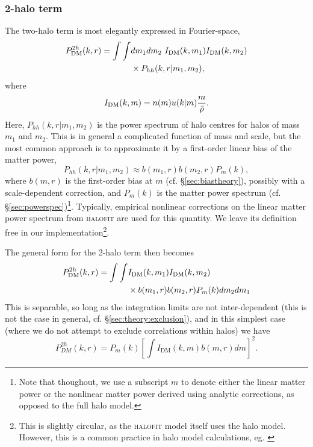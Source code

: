 \documentclass[5p,aas_macros]{elsarticle}
\begin{document}
\subsubsection{2-halo term}
\label{sec:theory:2halo}
The two-halo term is most elegantly expressed in Fourier-space, 
\begin{align}
    P_{\rm DM}^{2h}(k,r) =  \int \int & dm_1 dm_2\  I_{\rm DM}(k,m_1) I_{\rm DM}(k,m_2) \nonumber \\ 
    &\times P_{hh}(k,r|m_1,m_2),
\end{align}
where
\begin{equation}
    I_{\rm DM}(k,m) = n(m) u(k|m) \frac{m}{\bar{\rho}}.
\end{equation}
Here, $P_{hh}(k,r|m_1,m_2)$ is the power spectrum of halo centres for halos of mass $m_1$ and $m_2$. This is in general a complicated function of mass and scale, but the most common approach is to approximate it by a first-order linear bias of the matter power,
\begin{equation}
    \label{eq:halo_centre_power}
    P_{hh}(k,r|m_1,m_2) \approx b(m_1,r)b(m_2,r)P_m(k),
\end{equation}
where $b(m,r)$ is the first-order bias at $m$ (cf. \S\ref{sec:biastheory}), possibly with a scale-dependent correction, and $P_m(k)$ is the matter power spectrum (cf. \S\ref{sec:powerspec})\footnote{Note that thoughout, we use a subscript $m$ to denote either the linear matter power or the nonlinear matter power derived using analytic corrections, as opposed to the full halo model.}. Typically, empirical nonlinear corrections on the linear matter power spectrum from \textsc{halofit} \citep{Smith2003} are used for this quantity. We leave its definition free in our implementation\footnote{This is slightly circular, as the \textsc{halofit} model itself uses the halo model. However, this is a common practice in halo model calculations, eg. \citep{Cooray2002, Smith2011}}.

The general form for the 2-halo term then becomes
\begin{align}
\label{eq:dmpower2a}
    P_{\rm DM}^{2h}(k,r) =  \int\int & I_{\rm DM}(k,m_1) I_{\rm DM}(k,m_2) \nonumber \\
    &\times b(m_1,r)b(m_2,r)P_{m}(k) dm_2 dm_1
\end{align}
This is separable, so long as the integration limits are not inter-dependent (this is not the case in general, cf. \S\ref{sec:theory:exclusion}), and in this simplest case (where we do not attempt to exclude correlations within halos) we have
\begin{equation}
    \label{eq:dmpower2}
    P_{DM}^{2h}(k,r) = P_m(k) \left[ \int  I_\text{DM}(k,m) b(m,r) dm \right]^2.
\end{equation}
\end{document}
